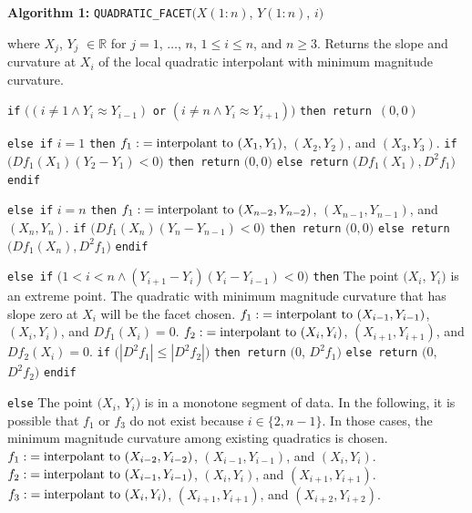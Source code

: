 \begin{plain}
\parskip=0pt
\vskip 5mm
{\parindent 0mm
{\bf Algorithm 1:} {
\tt QUADRATIC\_FACET}$\bigl(X(1{:}n)$, $Y(1{:}n)$, $i \bigr)$

where $X_j$, $Y_j$ $\in \mathbb{R}$ for $j = 1$, $\ldots$, $n$, $1 \le i
\le n$, and $n \ge 3$. Returns the slope and curvature at $X_i$ of the
local quadratic interpolant with minimum magnitude curvature.

}
{\parindent=3mm
\item{} {\tt if} $\bigl((i\ne1\wedge Y_i \approx Y_{i-1})$ {\tt or}
$(i\ne n\wedge Y_i \approx Y_{i+1})\bigr)$ {\tt then return $(0,0)$}

\item{} {\tt else if} $i=1$ {\tt then}
\itemitem{} $f_1\:\hbox{interpolant to }(X_1,Y_1)$,
  $(X_2,Y_2)$, and $(X_3,Y_3)$.
\itemitem{} {\tt if} $\bigl(Df_1(X_1)(Y_2-Y_1)<0\bigr)$ {\tt then return}
  $\bigl(0,0\bigr)$
\itemitem{} {\tt else return} $\bigl(Df_1(X_1),D^2f_1\bigr)$
\itemitem{} {\tt endif}

\item{} {\tt else if} $i=n$ {\tt then}
\itemitem{} $f_1\:\hbox{interpolant to }(X_{n-2},Y_{n-2})$,
  $(X_{n-1},Y_{n-1})$, and $(X_n,Y_n)$.
\itemitem{} {\tt if} $\bigl(Df_1(X_n)(Y_n-Y_{n-1})<0\bigr)$ {\tt then return}
  $\bigl(0,0\bigr)$
\itemitem{} {\tt else return} $\bigl(Df_1(X_n),D^2f_1\bigr)$
\itemitem{} {\tt endif}

\item{} {\tt else if} $\bigl(1<i<n\wedge (Y_{i+1} - Y_i)(Y_i - Y_{i-1}) < 0
\bigr)$ {\tt then}
\itemitem{} The point $(X_i$, $Y_i)$ is an extreme point. The
quadratic with minimum magnitude
curvature that has slope zero at $X_i$ will be the facet chosen.
\itemitem{} $f_1\:\hbox{interpolant to }(X_{i-1},Y_{i-1})$, $(X_i,Y_i)$,
  and $Df_1(X_i) = 0$.
\itemitem{} $f_2\:\hbox{interpolant to }(X_i,Y_i)$, $(X_{i+1},Y_{i+1})$,
  and $Df_2(X_i) = 0$.
\itemitem{} {\tt if} $\bigl(|D^2f_1| \leq |D^2f_2|\bigr)$ {\tt then
  return} $\bigl(0$, $D^2f_1\bigr)$
\itemitem{} {\tt else return} $\bigl(0$, $D^2f_2\bigr)$
\itemitem{} {\tt endif}

\item{} {\tt else}
\itemitem{} {The point $(X_i$, $Y_i)$ is in a monotone segment of
data. In the following, it is possible that $f_1$ or $f_3$ do
not exist because $i \in \{2, n-1\}$. In those cases, the minimum
magnitude curvature among existing quadratics is chosen.}
\itemitem{} $f_1\:\hbox{interpolant to }(X_{i-2},Y_{i-2})$,
  $(X_{i-1},Y_{i-1})$, and $(X_i,Y_i)$.
\itemitem{} $f_2\:\hbox{interpolant to }(X_{i-1},Y_{i-1})$,
  $(X_i,Y_i)$, and $(X_{i+1},Y_{i+1})$.
\itemitem{} $f_3\:\hbox{interpolant to }(X_i,Y_i)$,
  $(X_{i+1},Y_{i+1})$, and $(X_{i+2},Y_{i+2})$.

}
\end{plain}
